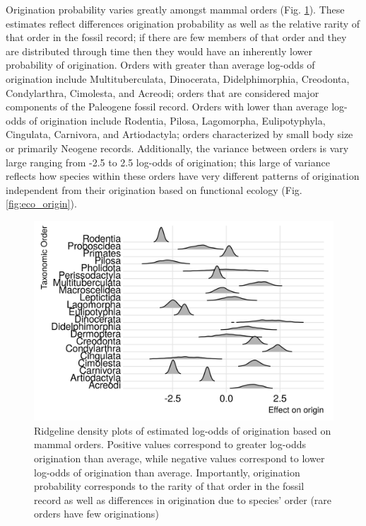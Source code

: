 \documentclass[12pt,letterpaper]{article}
\begin{document}
Origination probability varies greatly amongst mammal orders (Fig. \ref{fig:order_origin}). These estimates reflect differences origination probability as well as the relative rarity of that order in the fossil record; if there are few members of that order and they are distributed through time then they would have an inherently lower probability of origination. Orders with greater than average log-odds of origination include Multituberculata, Dinocerata, Didelphimorphia, Creodonta, Condylarthra, Cimolesta, and Acreodi; orders that are considered major components of the Paleogene fossil record. Orders with lower than average log-odds of origination include Rodentia, Pilosa, Lagomorpha, Eulipotyphyla, Cingulata, Carnivora, and Artiodactyla; orders characterized by small body size or primarily Neogene records. Additionally, the variance between orders is vary large ranging from -2.5 to 2.5 log-odds of origination; this large of variance reflects how species within these orders have very different patterns of origination independent from their origination based on functional ecology (Fig. \ref{fig:eco_origin}).
\begin{figure}[ht]
  \centering
  \includegraphics[width=\textwidth,height=0.4\textheight,keepaspectratio=true]{figure/order_origin_bd}
  \caption{Ridgeline density plots of estimated log-odds of origination based on mammal orders. Positive values correspond to greater log-odds origination than average, while negative values correspond to lower log-odds of origination than average. Importantly, origination probability corresponds to the rarity of that order in the fossil record as well as differences in origination due to species' order (rare orders have few originations)}
  \label{fig:order_origin}
\end{figure}
\end{document}
